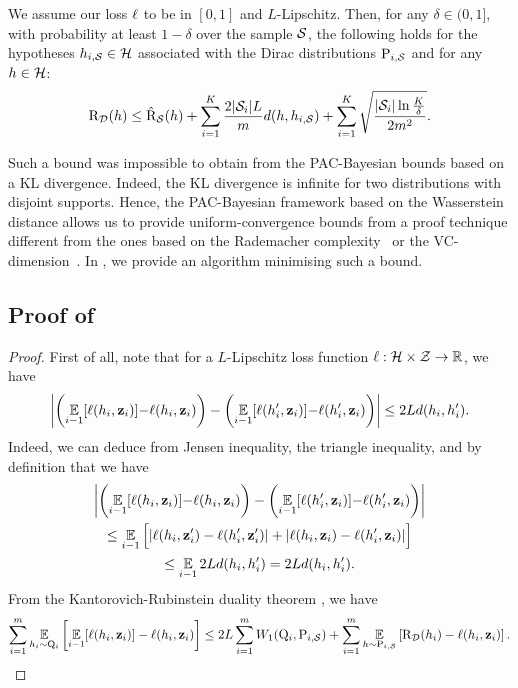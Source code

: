 \begin{noaddcontents}
    \begin{corollary}\label{corollary:supervised-nnl} We assume our loss $\loss$ to be in $[0,1]$ and $L$-Lipschitz. 
    Then, for any $\delta\in(0,1]$, with probability at least $1-\delta$ over the sample $\S$, the following holds for the hypotheses $h_{i,\S}\in\H$ associated with the Dirac distributions $\P_{i,\S}$ and for any $h\in\H$: 
    \begin{align*}
    \Risk_{\D}(h) \le \Riskhat_{\S}(h) + \sum_{i=1}^{K} \frac{2|\S_i|L}{m} d(h, h_{i,\S}) + \sum_{i=1}^{K} \sqrt{\frac{|\S_i|\ln\frac{K}{\delta}}{2m^2}}.
    \end{align*}
    \end{corollary}
    
    Such a bound was impossible to obtain from the PAC-Bayesian bounds based on a KL divergence.
    Indeed, the KL divergence is infinite for two distributions with disjoint supports. 
    Hence, the PAC-Bayesian framework based on the Wasserstein distance allows us to provide uniform-convergence bounds from a proof technique different from the ones based on the Rademacher complexity~\cite{koltchinskii2000rademacher,bartlett2001rademacher,bartlett2002rademacher} or the VC-dimension~\cite{vapnik1968uniform,vapnik1974theory}.
    In , we provide an algorithm minimising such a bound.
    
    \subsection{Proof of }
    \label{sec:proof-online-ht}
    
    \theoremonlineht*
    \begin{proof}
    First of all, note that for a $L$-Lipschitz loss function $\loss: \H\times\Z\to\R$, we have
    \begin{align}
    \LN\LP \EE_{i-1}[\loss(h_i,\z_i)]{-}\loss(h_i, \z_i)\RP - \LP \EE_{i-1}[\loss(h'_i,\z_i)]{-}\loss(h'_i, \z_i)\RP\right\vert \le 2Ld(h_i, h'_i).\label{eq:proof-online-ht-1}
    \end{align}
    Indeed, we can deduce  from Jensen inequality, the triangle inequality, and by definition that we have
    \begin{multline*}
    \LN\LP\EE_{i-1}[\loss(h_i,\z_i)]{-}\loss(h_i, \z_i)\RP - \LP\EE_{i-1}[\loss(h'_i,\z_i)]{-}\loss(h'_i, \z_i)\RP\right\vert \\ 
    \le \EE_{i-1}\Big[ |\loss(h_i, \z'_i)-\loss(h'_i, \z'_i)|+|\loss(h_i, \z_i)-\loss(h'_i, \z_i)|\Big]\\
     \le \EE_{i-1} 2Ld(h_i, h'_i) = 2Ld(h_i, h'_i).
    \end{multline*}
    From the Kantorovich-Rubinstein duality theorem \cite[Remark 6.5]{villani2009optimal}, we have
    \begin{align*}
    \sum_{i=1}^{m}\EE_{h_i\sim\Q_{i}}\LB\EE_{i-1}[\loss(h_i,\z_i)]-\loss(h_i, \z_i) \RB \le 2L\sum_{i=1}^{m}W_1(\Q_{i}, \P_{i,\S}) + \sum_{i=1}^{m}\EE_{h\sim\P_{i,\S}}\LB\Risk_{\D}(h_i)-\loss(h_i, \z_i) \RB.
    \end{align*}
    

\end{proof}
\end{noaddcontents}
